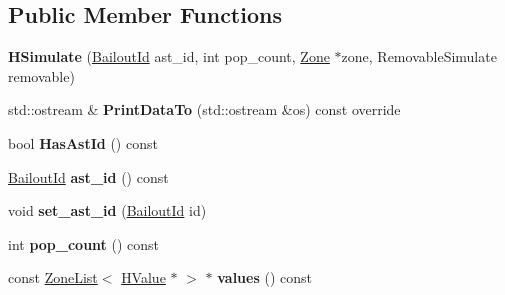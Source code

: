\subsection*{Public Member Functions}
\begin{DoxyCompactItemize}
\item 
{\bfseries H\+Simulate} (\hyperlink{classv8_1_1internal_1_1_bailout_id}{Bailout\+Id} ast\+\_\+id, int pop\+\_\+count, \hyperlink{classv8_1_1internal_1_1_zone}{Zone} $\ast$zone, Removable\+Simulate removable)\hypertarget{classv8_1_1internal_1_1_h_simulate_ae0188c2ed9b5b74d597f928454177ac5}{}\label{classv8_1_1internal_1_1_h_simulate_ae0188c2ed9b5b74d597f928454177ac5}

\item 
std\+::ostream \& {\bfseries Print\+Data\+To} (std\+::ostream \&os) const  override\hypertarget{classv8_1_1internal_1_1_h_simulate_a1c7ec152be51d0e618379fa6d3d13552}{}\label{classv8_1_1internal_1_1_h_simulate_a1c7ec152be51d0e618379fa6d3d13552}

\item 
bool {\bfseries Has\+Ast\+Id} () const \hypertarget{classv8_1_1internal_1_1_h_simulate_ad69615b20465b286513289cc7a798657}{}\label{classv8_1_1internal_1_1_h_simulate_ad69615b20465b286513289cc7a798657}

\item 
\hyperlink{classv8_1_1internal_1_1_bailout_id}{Bailout\+Id} {\bfseries ast\+\_\+id} () const \hypertarget{classv8_1_1internal_1_1_h_simulate_a03a8e3472e9e07faa975891e39372fc3}{}\label{classv8_1_1internal_1_1_h_simulate_a03a8e3472e9e07faa975891e39372fc3}

\item 
void {\bfseries set\+\_\+ast\+\_\+id} (\hyperlink{classv8_1_1internal_1_1_bailout_id}{Bailout\+Id} id)\hypertarget{classv8_1_1internal_1_1_h_simulate_a0bb0e7f2ef3e501d15e50df3c2821a3b}{}\label{classv8_1_1internal_1_1_h_simulate_a0bb0e7f2ef3e501d15e50df3c2821a3b}

\item 
int {\bfseries pop\+\_\+count} () const \hypertarget{classv8_1_1internal_1_1_h_simulate_af704565be54dfdbdff0202a5c25257e8}{}\label{classv8_1_1internal_1_1_h_simulate_af704565be54dfdbdff0202a5c25257e8}

\item 
const \hyperlink{classv8_1_1internal_1_1_zone_list}{Zone\+List}$<$ \hyperlink{classv8_1_1internal_1_1_h_value}{H\+Value} $\ast$ $>$ $\ast$ {\bfseries values} () const \hypertarget{classv8_1_1internal_1_1_h_simulate_a8d3d9aef5a47df839f66224ccc7c6b88}{}\label{classv8_1_1internal_1_1_h_simulate_a8d3d9aef5a47df839f66224ccc7c6b88}


\end{DoxyCompactItemize}
